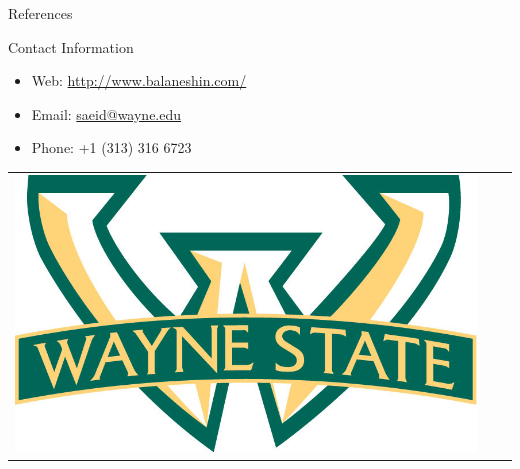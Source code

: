 \documentclass[final]{beamer}
\newlength{\onecolwid}
\begin{document}
\begin{frame}[t]
\begin{columns}[t]
\begin{column}{\onecolwid}
\begin{block}{References}

\nocite{*} %
\small{
\vspace{0.75in}}

\end{block}






\begin{alertblock}{Contact Information}

\begin{itemize}
\item Web: \href{http://www.balaneshin.com/}{http://www.balaneshin.com/}
\item Email: \href{mailto:saeid@wayne.edu}{saeid@wayne.edu}
\item Phone: +1 (313) 316 6723
\end{itemize}

\end{alertblock}

\begin{center}
\begin{tabular}{ccc}
\includegraphics[width=0.3\linewidth]{images/warrior_banded_logo.jpg} & \hfill & %
\end{tabular}
\end{center}


\end{column} %

\end{columns} %

\end{frame} %
\end{document}
